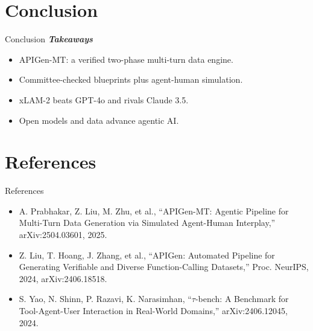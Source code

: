 \documentclass{beamer}
\begin{document}
\section{Conclusion}
\begin{frame}{Conclusion}
\textbf{\textit{Takeaways}}
\begin{itemize}
\item APIGen-MT: a verified two-phase multi-turn data engine.
\item Committee-checked blueprints plus agent-human simulation.
\item xLAM-2 beats GPT-4o and rivals Claude 3.5.
\item Open models and data advance agentic AI.
\end{itemize}
\end{frame}

\section{References}
\begin{frame}{References}
\footnotesize
\begin{itemize}
\item A. Prabhakar, Z. Liu, M. Zhu, et al., ``APIGen-MT: Agentic Pipeline for Multi-Turn Data Generation via Simulated Agent-Human Interplay,'' arXiv:2504.03601, 2025.
\item Z. Liu, T. Hoang, J. Zhang, et al., ``APIGen: Automated Pipeline for Generating Verifiable and Diverse Function-Calling Datasets,'' Proc. NeurIPS, 2024, arXiv:2406.18518.
\item S. Yao, N. Shinn, P. Razavi, K. Narasimhan, ``$\tau$-bench: A Benchmark for Tool-Agent-User Interaction in Real-World Domains,'' arXiv:2406.12045, 2024.
\end{itemize}
\end{frame}
\begin{frame}\vfill{}\vfill\end{frame}
\end{document}

